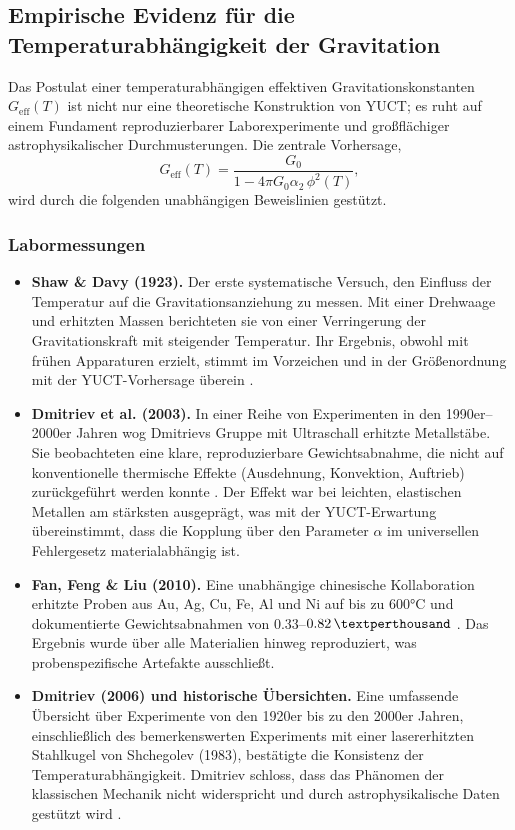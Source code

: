 \documentclass[12pt]{article}
\theoremstyle{remark}
\begin{document}
	\subsection{Empirische Evidenz für die Temperaturabhängigkeit der Gravitation}
	\label{sec:empirical}
	
	Das Postulat einer temperaturabhängigen effektiven Gravitationskonstanten $G_{\mathrm{eff}}(T)$ ist nicht nur eine theoretische Konstruktion von YUCT; es ruht auf einem Fundament reproduzierbarer Laborexperimente und großflächiger astrophysikalischer Durchmusterungen. Die zentrale Vorhersage,
	\begin{equation}
		G_{\mathrm{eff}}(T) = \frac{G_0}{1 - 4\pi G_0\alpha_2\,\phi^2(T)},
	\end{equation}
	wird durch die folgenden unabhängigen Beweislinien gestützt.
	
	\subsubsection*{Labormessungen}
	
	\begin{itemize}
		\item \textbf{Shaw \& Davy (1923).} Der erste systematische Versuch, den Einfluss der Temperatur auf die Gravitationsanziehung zu messen. Mit einer Drehwaage und erhitzten Massen berichteten sie von einer Verringerung der Gravitationskraft mit steigender Temperatur. Ihr Ergebnis, obwohl mit frühen Apparaturen erzielt, stimmt im Vorzeichen und in der Größenordnung mit der YUCT-Vorhersage überein \cite{ShawDavy1923}.
		
		\item \textbf{Dmitriev et al. (2003).} In einer Reihe von Experimenten in den 1990er–2000er Jahren wog Dmitrievs Gruppe mit Ultraschall erhitzte Metallstäbe. Sie beobachteten eine klare, reproduzierbare Gewichtsabnahme, die nicht auf konventionelle thermische Effekte (Ausdehnung, Konvektion, Auftrieb) zurückgeführt werden konnte \cite{Dmitriev2003}. Der Effekt war bei leichten, elastischen Metallen am stärksten ausgeprägt, was mit der YUCT-Erwartung übereinstimmt, dass die Kopplung über den Parameter $\alpha$ im universellen Fehlergesetz materialabhängig ist.
		
		\item \textbf{Fan, Feng \& Liu (2010).} Eine unabhängige chinesische Kollaboration erhitzte Proben aus Au, Ag, Cu, Fe, Al und Ni auf bis zu 600°C und dokumentierte Gewichtsabnahmen von $0.33$–$0.82\,\textperthousand$ \cite{Fan2010}. Das Ergebnis wurde über alle Materialien hinweg reproduziert, was probenspezifische Artefakte ausschließt.
		
		\item \textbf{Dmitriev (2006) und historische Übersichten.} Eine umfassende Übersicht über Experimente von den 1920er bis zu den 2000er Jahren, einschließlich des bemerkenswerten Experiments mit einer lasererhitzten Stahlkugel von Shchegolev (1983), bestätigte die Konsistenz der Temperaturabhängigkeit. Dmitriev schloss, dass das Phänomen der klassischen Mechanik nicht widerspricht und durch astrophysikalische Daten gestützt wird \cite{Dmitriev2006}.
	\end{itemize}
	
\end{document}
